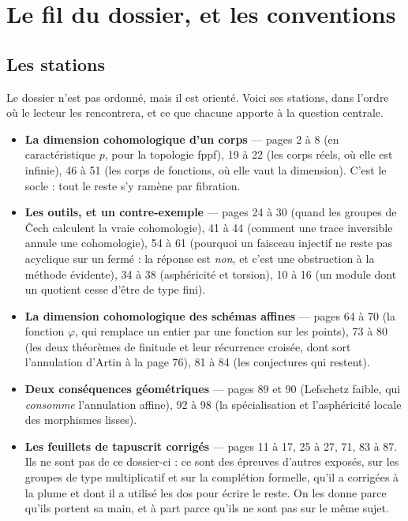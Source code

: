 \documentclass[11pt,a4paper]{article}
\begin{document}
\section*{Le fil du dossier, et les conventions}

\subsection*{Les stations}

Le dossier n'est pas ordonné, mais il est orienté. Voici ses stations, dans
l'ordre où le lecteur les rencontrera, et ce que chacune apporte à la question
centrale.

\begin{itemize}
\item \textbf{La dimension cohomologique d'un corps} — pages 2 à 8 (en
caractéristique $p$, pour la topologie fppf), 19 à 22 (les corps réels, où
elle est infinie), 46 à 51 (les corps de fonctions, où elle vaut la
dimension). C'est le socle : tout le reste s'y ramène par fibration.
\item \textbf{Les outils, et un contre-exemple} — pages 24 à 30 (quand les
groupes de Čech calculent la vraie cohomologie), 41 à 44 (comment une trace
inversible annule une cohomologie), 54 à 61 (pourquoi un faisceau injectif ne
reste pas acyclique sur un fermé : la réponse est \emph{non}, et c'est une
obstruction à la méthode évidente), 34 à 38 (asphéricité et torsion), 10 à 16
(un module dont un quotient cesse d'être de type fini).
\item \textbf{La dimension cohomologique des schémas affines} — pages 64 à 70
(la fonction $\varphi$, qui remplace un entier par une fonction sur les points),
73 à 80 (les deux théorèmes de finitude et leur récurrence croisée, dont sort
l'annulation d'Artin à la page 76), 81 à 84 (les conjectures qui restent).
\item \textbf{Deux conséquences géométriques} — pages 89 et 90 (Lefschetz
faible, qui \emph{consomme} l'annulation affine), 92 à 98 (la spécialisation et
l'asphéricité locale des morphismes lisses).
\item \textbf{Les feuillets de tapuscrit corrigés} — pages 11 à 17, 25 à 27,
71, 83 à 87. Ils ne sont pas de ce dossier-ci : ce sont des épreuves d'autres
exposés, sur les groupes de type multiplicatif et sur la complétion formelle,
qu'il a corrigées à la plume et dont il a utilisé les dos pour écrire le reste.
On les donne parce qu'ils portent sa main, et à part parce qu'ils ne sont pas
sur le même sujet.
\end{itemize}
\end{document}
